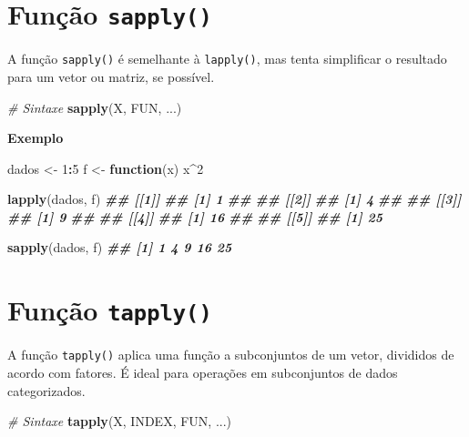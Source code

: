 \documentclass[
]{book}
\newenvironment{Shaded}{\begin{snugshade}}{\end{snugshade}}
\newcommand{\CommentTok}[1]{\textcolor[rgb]{0.56,0.35,0.01}{\textit{#1}}}
\newcommand{\ControlFlowTok}[1]{\textcolor[rgb]{0.13,0.29,0.53}{\textbf{#1}}}
\newcommand{\DecValTok}[1]{\textcolor[rgb]{0.00,0.00,0.81}{#1}}
\newcommand{\DocumentationTok}[1]{\textcolor[rgb]{0.56,0.35,0.01}{\textbf{\textit{#1}}}}
\newcommand{\FunctionTok}[1]{\textcolor[rgb]{0.13,0.29,0.53}{\textbf{#1}}}
\newcommand{\NormalTok}[1]{#1}
\newcommand{\OtherTok}[1]{\textcolor[rgb]{0.56,0.35,0.01}{#1}}
\newcommand{\SpecialCharTok}[1]{\textcolor[rgb]{0.81,0.36,0.00}{\textbf{#1}}}
\begin{document}
\section{\texorpdfstring{Função \texttt{sapply()}}{Função sapply()}}\label{funuxe7uxe3o-sapply}

A função \texttt{sapply()} é semelhante à \texttt{lapply()}, mas tenta simplificar o
resultado para um vetor ou matriz, se possível.

\begin{Shaded}
\begin{Highlighting}[]
\CommentTok{\# Sintaxe}
\FunctionTok{sapply}\NormalTok{(X, FUN, ...)}
\end{Highlighting}
\end{Shaded}

\textbf{Exemplo}

\begin{Shaded}
\begin{Highlighting}[]
\NormalTok{dados }\OtherTok{\textless{}{-}} \DecValTok{1}\SpecialCharTok{:}\DecValTok{5}
\NormalTok{f }\OtherTok{\textless{}{-}} \ControlFlowTok{function}\NormalTok{(x) x}\SpecialCharTok{\^{}}\DecValTok{2}

\FunctionTok{lapply}\NormalTok{(dados, f)}
\DocumentationTok{\#\# [[1]]}
\DocumentationTok{\#\# [1] 1}
\DocumentationTok{\#\# }
\DocumentationTok{\#\# [[2]]}
\DocumentationTok{\#\# [1] 4}
\DocumentationTok{\#\# }
\DocumentationTok{\#\# [[3]]}
\DocumentationTok{\#\# [1] 9}
\DocumentationTok{\#\# }
\DocumentationTok{\#\# [[4]]}
\DocumentationTok{\#\# [1] 16}
\DocumentationTok{\#\# }
\DocumentationTok{\#\# [[5]]}
\DocumentationTok{\#\# [1] 25}

\FunctionTok{sapply}\NormalTok{(dados, f)}
\DocumentationTok{\#\# [1]  1  4  9 16 25}
\end{Highlighting}
\end{Shaded}

\section{\texorpdfstring{Função \texttt{tapply()}}{Função tapply()}}\label{funuxe7uxe3o-tapply}

A função \texttt{tapply()} aplica uma função a subconjuntos de um vetor,
divididos de acordo com fatores. É ideal para operações em subconjuntos
de dados categorizados.

\begin{Shaded}
\begin{Highlighting}[]
\CommentTok{\# Sintaxe}
\FunctionTok{tapply}\NormalTok{(X, INDEX, FUN, ...)}
\end{Highlighting}
\end{Shaded}
\end{document}
